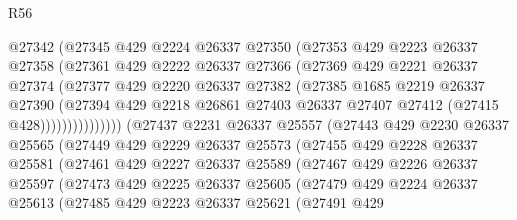 \begin{lexlean}{R56}
\begin{coremodule}
                      @27342
                      (@27345
                        @429
                        @2224
                        @26337
                        @27350
                        (@27353
                          @429
                          @2223
                          @26337
                          @27358
                          (@27361
                            @429
                            @2222
                            @26337
                            @27366
                            (@27369
                              @429
                              @2221
                              @26337
                              @27374
                              (@27377
                                @429
                                @2220
                                @26337
                                @27382
                                (@27385
                                  @1685
                                  @2219
                                  @26337
                                  @27390
                                  (@27394
                                    @429
                                    @2218
                                    @26861
                                    @27403
                                    @26337
                                    @27407
                                    @27412
                                    (@27415 @428)))))))))))))))
        (@27437
          @2231
          @26337
          @25557
          (@27443
            @429
            @2230
            @26337
            @25565
            (@27449
              @429
              @2229
              @26337
              @25573
              (@27455
                @429
                @2228
                @26337
                @25581
                (@27461
                  @429
                  @2227
                  @26337
                  @25589
                  (@27467
                    @429
                    @2226
                    @26337
                    @25597
                    (@27473
                      @429
                      @2225
                      @26337
                      @25605
                      (@27479
                        @429
                        @2224
                        @26337
                        @25613
                        (@27485
                          @429
                          @2223
                          @26337
                          @25621
                          (@27491
                            @429

\end{coremodule}
\end{lexlean}
